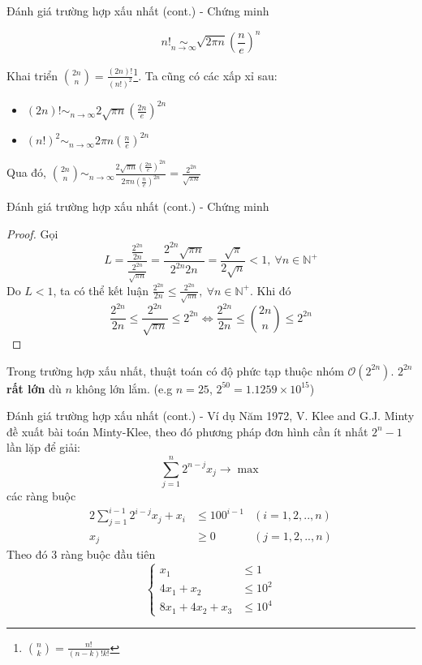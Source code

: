 \documentclass[10pt]{beamer}
\begin{document}
\begin{frame}{Đánh giá trường hợp xấu nhất (cont.) - Chứng minh}
\begin{theorem}
$$
\displaystyle
n! \operatorname*{\sim}_{n\to\infty} \sqrt{2\pi n}\left(\frac{n}{e}\right)^n
$$
\end{theorem}
Khai triển $\displaystyle \binom{2n}{n} = \frac{(2n)!}{(n!)^2}$\footnote{$\binom{n}{k} = \frac{n!}{(n - k)!k!}$}. Ta cũng có các xấp xỉ sau:
\begin{itemize}
\item $\displaystyle (2n)! \operatorname*{\sim}_{n\to\infty} 2\sqrt{\pi n} \left(\frac{2n}{e}\right)^{2n}$ 
\item $\displaystyle (n!)^2 \operatorname*{\sim}_{n\to\infty} 2\pi n \left(\frac{n}{e}\right)^{2n}$ 
\end{itemize}
Qua đó, $\displaystyle \binom{2n}{n} \operatorname*{\sim}_{n\to\infty} \frac{2\sqrt{\pi n} \left(\frac{2n}{e}\right)^{2n}}{2\pi n \left(\frac{n}{e}\right)^{2n}} =  \frac{2^{2n}}{\sqrt{\pi n}}$
\end{frame}

\begin{frame}{Đánh giá trường hợp xấu nhất (cont.) - Chứng minh}
\begin{proof}
Gọi
$$
\displaystyle
L = \frac{\frac{2^{2n}}{2n}}{\frac{2^{2n}}{\sqrt{\pi n}}} = \frac{2^{2n}\sqrt{\pi n}}{2^{2n} 2n} = \frac{\sqrt{\pi}}{2\sqrt{n}} < 1,\ \forall n \in \mathbb{N^+}
$$
Do $L < 1$, ta có thể kết luận $\frac{2^{2n}}{2n} \leq \frac{2^{2n}}{\sqrt{\pi n}},\ \forall n \in \mathbb{N^+}
$. Khi đó
$$
\displaystyle
\frac{2^{2n}}{2n} \leq \frac{2^{2n}}{\sqrt{\pi n}} \leq 2^{2n} \iff \frac{2^{2n}}{2n} \leq \binom{2n}{n} \leq 2^{2n}
$$
\end{proof}
Trong trường hợp xấu nhất, thuật toán có độ phức tạp thuộc nhóm $\mathcal{O}(2^{2n})$. $2^{2n}$ \textbf{rất lớn} dù $n$ không lớn lắm. (e.g $n = 25$, $2^{50} = 1.1259\times 10^{15}$)
\end{frame}

\begin{frame}{Đánh giá trường hợp xấu nhất (cont.) - Ví dụ}
Năm 1972, V. Klee and G.J. Minty\cite{klee1970good} đề xuất bài toán Minty-Klee, theo đó phương pháp đơn hình cần ít nhất $2^n - 1$ lần lặp để giải:
$$
\sum_{j = 1}^{n} 2^{n - j} x_j \rightarrow \max
$$
các ràng buộc
\begin{equation*}
\begin{aligned}
2\sum_{j = 1}^{i - 1} 2^{i - j}x_j + x_i &\leq 100^{i - 1} & (i = 1, 2, .., n)\\
x_j &\geq 0 & (j = 1, 2, .., n)
\end{aligned}
\end{equation*}
Theo đó 3 ràng buộc đầu tiên
$$
\left\{
\begin{array}{lll}
x_1 &\leq 1\\
4x_1 + x_2 &\leq 10^2\\
8x_1 + 4x_2 + x_3 &\leq 10^4
\end{array}
\right.
$$
\end{frame}
\end{document}
